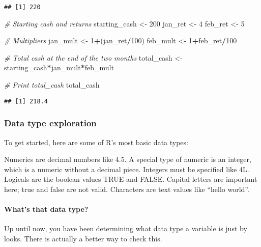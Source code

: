 \documentclass[]{article}
\newenvironment{Shaded}{\begin{snugshade}}{\end{snugshade}}
\newcommand{\DecValTok}[1]{\textcolor[rgb]{0.00,0.00,0.81}{#1}}
\newcommand{\StringTok}[1]{\textcolor[rgb]{0.31,0.60,0.02}{#1}}
\newcommand{\CommentTok}[1]{\textcolor[rgb]{0.56,0.35,0.01}{\textit{#1}}}
\newcommand{\OperatorTok}[1]{\textcolor[rgb]{0.81,0.36,0.00}{\textbf{#1}}}
\newcommand{\NormalTok}[1]{#1}
\let\oldparagraph\paragraph
\renewcommand{\paragraph}[1]{\oldparagraph{#1}\mbox{}}
\begin{document}
\begin{verbatim}
## [1] 220
\end{verbatim}

\begin{Shaded}
\begin{Highlighting}[]
\CommentTok{# Starting cash and returns }
\NormalTok{starting_cash <-}\StringTok{ }\DecValTok{200}
\NormalTok{jan_ret <-}\StringTok{ }\DecValTok{4}
\NormalTok{feb_ret <-}\StringTok{ }\DecValTok{5}

\CommentTok{# Multipliers}
\NormalTok{jan_mult <-}\StringTok{ }\DecValTok{1}\OperatorTok{+}\NormalTok{(jan_ret}\OperatorTok{/}\DecValTok{100}\NormalTok{)}
\NormalTok{feb_mult <-}\StringTok{ }\DecValTok{1}\OperatorTok{+}\NormalTok{feb_ret}\OperatorTok{/}\DecValTok{100}

\CommentTok{# Total cash at the end of the two months}
\NormalTok{total_cash <-}\StringTok{ }\NormalTok{starting_cash}\OperatorTok{*}\NormalTok{jan_mult}\OperatorTok{*}\NormalTok{feb_mult}

\CommentTok{# Print total_cash}
\NormalTok{total_cash}
\end{Highlighting}
\end{Shaded}

\begin{verbatim}
## [1] 218.4
\end{verbatim}

\subsubsection{Data type exploration}\label{data-type-exploration}

To get started, here are some of R's most basic data types:

Numerics are decimal numbers like 4.5. A special type of numeric is an
integer, which is a numeric without a decimal piece. Integers must be
specified like 4L. Logicals are the boolean values TRUE and FALSE.
Capital letters are important here; true and false are not valid.
Characters are text values like ``hello world''.

\paragraph{What's that data type?}\label{whats-that-data-type}

Up until now, you have been determining what data type a variable is
just by looks. There is actually a better way to check this.
\end{document}
